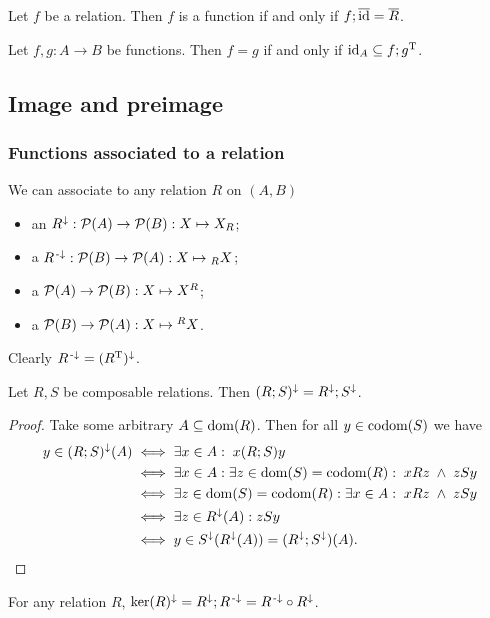 \begin{lemma}
Let $f$ be a relation. Then $f$ is a function \textup{if and only if} $f;\overline{\operatorname{id}} = \overline{R}$.
\end{lemma}

\begin{lemma} \label{functionEqualityIdComparison}
Let $f,g: A\to B$ be functions. Then $f = g$ \textup{if and only if} $\operatorname{id}_A \subseteq f;g^{\mathrm{T}}$.
\end{lemma}

\subsection{Image and preimage}
\subsubsection{Functions associated to a relation}
We can associate to any relation $R$ on $(A,B)$
\begin{itemize}
\item an  $R^{\downarrow}: \operatorname{\mathcal{P}}(A) \to \operatorname{\mathcal{P}}(B): X \mapsto X_R$;
\item a  $R^{{\text{\hspace{0.15em}-}\downarrow}}: \operatorname{\mathcal{P}}(B) \to \operatorname{\mathcal{P}}(A): X \mapsto {_RX}$;
\item a  $\operatorname{\mathcal{P}}(A) \to \operatorname{\mathcal{P}}(B): X \mapsto X^R$;
\item a  $\operatorname{\mathcal{P}}(B) \to \operatorname{\mathcal{P}}(A): X \mapsto {^RX}$.
\end{itemize}

Clearly $R^{{\text{\hspace{0.15em}-}\downarrow}} = (R^{\mathrm{T}})^\downarrow$.

\begin{lemma}
Let $R,S$ be composable relations. Then $(R;S)^\downarrow = R^\downarrow;S^\downarrow$.
\end{lemma}
\begin{proof}
Take some arbitrary $A\subseteq \operatorname{dom}(R)$. Then for all $y\in \operatorname{codom}(S)$ we have
\begin{align*}
y \in (R;S)^\downarrow(A) &\iff \exists x\in A:\; x(R;S)y \\
&\iff \exists x\in A:\exists z\in \operatorname{dom}(S) = \operatorname{codom}(R): \; xRz\;\wedge\; zSy \\
&\iff \exists z\in \operatorname{dom}(S) = \operatorname{codom}(R):\exists x\in A: \; xRz\;\wedge\; zSy \\
&\iff \exists z\in R^\downarrow(A): zSy \\
&\iff y\in S^\downarrow(R^\downarrow(A)) = (R^\downarrow;S^\downarrow)(A).
\end{align*}
\end{proof}
\begin{corollary}
For any relation $R$, $\ker(R)^\downarrow = R^\downarrow;R^{\text{\hspace{0.15em}-}\downarrow} = R^{\text{\hspace{0.15em}-}\downarrow}\circ R^\downarrow$.
\end{corollary}

